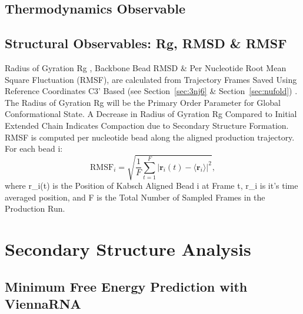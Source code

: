 \subsection{Thermodynamics Observable }

\subsection{Structural Observables: Rg, RMSD & RMSF} \label{sec:structural_obs}
Radius of Gyration Rg , Backbone Bead RMSD & Per Nucleotide Root Mean Square Fluctuation (RMSF), are calculated from Trajectory Frames Saved Using Reference Coordinates C3’ Based (see Section~\ref{sec:3nj6} & Section~\ref{sec:nufold}) .
The Radius of Gyration Rg will be the Primary Order Parameter for Global Conformational State. A Decrease in Radius of Gyration Rg Compared to Initial Extended Chain Indicates Compaction due to Secondary Structure Formation.
RMSF is computed per nucleotide bead along the aligned production trajectory. For each bead i:
\begin{equation}\mathrm{RMSF}_i = \sqrt{\frac{1}{F}\sum_{t=1}^{F}\left|\mathbf{r}_i(t) - \langle\mathbf{r}_i\rangle\right|^2},\label{eq:rmsf}\end{equation}
where r_i(t) is the Position of Kabsch Aligned Bead i at Frame t, \langle r_i \rangle is it's time averaged position, and F is the Total Number of Sampled Frames in the Production Run.






\section{Secondary Structure Analysis}
\label{sec:sec_struct}

\subsection{Minimum Free Energy Prediction with ViennaRNA}

